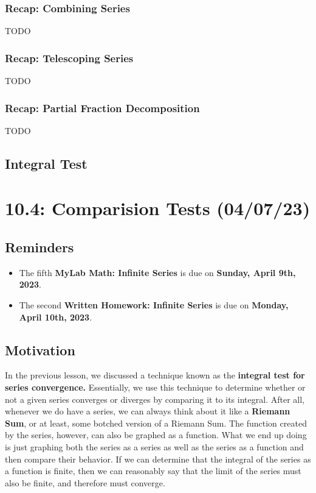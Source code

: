 \documentclass{report}
\begin{document}
\begin{sloppypar}
\subsection{Recap: Combining Series}
TODO
\subsection{Recap: Telescoping Series}
TODO
\subsection{Recap: Partial Fraction Decomposition}
TODO

\section{Integral Test}

\chapter{10.4: Comparision Tests (04/07/23)}
\section{Reminders}

\begin{itemize}
  \item The fifth \textbf{MyLab Math: Infinite Series} is due on
        \textbf{Sunday, April 9th, 2023}.
  \item The second \textbf{Written Homework: Infinite Series} is due on
        \textbf{Monday, April 10th, 2023}.
\end{itemize}

\section{Motivation}
In the previous lesson, we discussed a technique known as the
\textbf{integral test for series convergence.} Essentially,
we use this technique to determine whether or not a given series
converges or diverges by comparing it to its integral. After all,
whenever we do have a series, we can always think about it like
a \textbf{Riemann Sum}, or at least, some botched version of a
Riemann Sum. The function created by the series, however, can
also be graphed as a function. What we end up doing is just
graphing both the series as a series as well as the series as a
function and then compare their behavior. If we can determine
that the integral of the series as a function is finite,
then we can reasonably say that the limit of the series must
also be finite, and therefore must converge.


\end{sloppypar}
\end{document}
